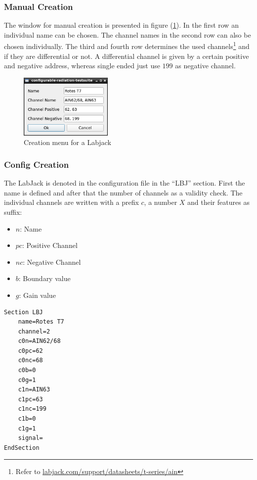 \documentclass[10pt,a4paper]{article}
\begin{document}
	\subsubsection{Manual Creation}	
	
	The window for manual creation is presented in figure (\ref{f:lbj_menu}). In the first row an individual name can be chosen. The channel names in the second row can also be chosen individually. The third and fourth row determines the used channels\footnote{Refer to \url{labjack.com/support/datasheets/t-series/ain}} and if they are differential or not. A differential channel is given by a certain positive and negative address, whereas single ended just use $199$ as negative channel.
	
	
	\begin{figure}[H]
	\centering
	\includegraphics[width=0.4\textwidth]{./3_LBJ_menu.png}
	\caption{Creation menu for a Labjack}
	\label{f:lbj_menu}
	\end{figure}
	
	\subsubsection{Config Creation}	
	The LabJack is denoted in the configuration file in the \enquote{LBJ} section. First the name is defined and after that the number of channels as a validity check. The individual channels are written with a prefix $c$, a number $X$ and their features as suffix:
	
	\begin{itemize}
	\item $n$: Name
	\item $pc$: Positive Channel
	\item $nc$: Negative Channel
	\item $b$: Boundary value
	\item $g$: Gain value
	\end{itemize}
	
\begin{lstlisting}[caption=LBJ Config]
Section LBJ
	name=Rotes T7
	channel=2
	c0n=AIN62/68
	c0pc=62
	c0nc=68
	c0b=0
	c0g=1
	c1n=AIN63
	c1pc=63
	c1nc=199
	c1b=0
	c1g=1
	signal=
EndSection
\end{lstlisting}
	
\end{document}
